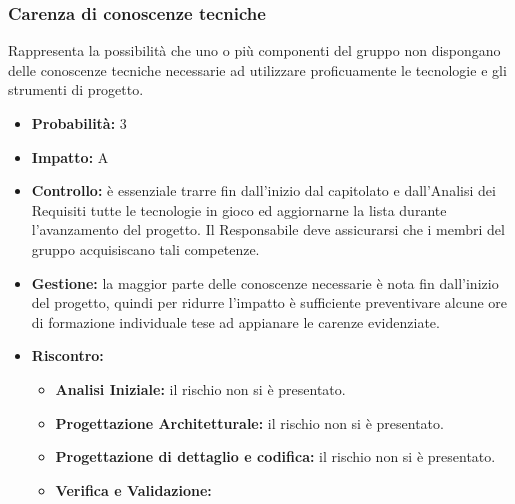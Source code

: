 \documentclass[a4paper,11pt]{article}
\begin{document}
		\subsubsection{Carenza di conoscenze tecniche}
		Rappresenta la possibilità che uno o più componenti del gruppo non dispongano delle conoscenze tecniche necessarie ad utilizzare proficuamente le tecnologie e gli strumenti di progetto.
		\begin{itemize}
		\item \textbf{Probabilità: }3
		\item \textbf{Impatto: }A
		\item \textbf{Controllo:} è essenziale trarre fin dall'inizio dal capitolato e dall'Analisi dei Requisiti tutte le tecnologie in gioco ed aggiornarne la lista durante l'avanzamento del progetto. Il Responsabile deve assicurarsi che i membri del gruppo acquisiscano tali competenze.
		\item \textbf{Gestione:} la maggior parte delle conoscenze necessarie è nota fin dall'inizio del progetto, quindi per ridurre l'impatto è sufficiente preventivare alcune ore di formazione individuale tese ad appianare le carenze evidenziate.
		\item \textbf{Riscontro:}
			\begin{itemize}
				\item\textbf{Analisi Iniziale:} il rischio non si è presentato.
				\item\textbf{Progettazione Architetturale:} il rischio non si è presentato.
				\item\textbf{Progettazione di dettaglio e codifica:} il rischio non si è presentato.
				\item\textbf{Verifica e Validazione:}
			\end{itemize}
		\end{itemize}
\end{document}
